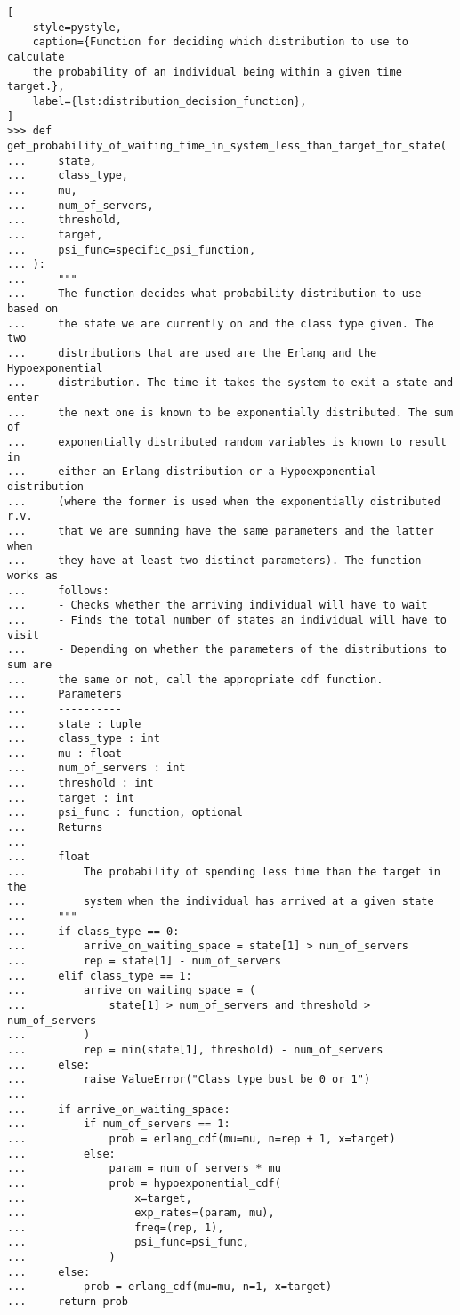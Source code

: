 \begin{lstlisting}[
    style=pystyle,
    caption={Function for deciding which distribution to use to calculate
    the probability of an individual being within a given time target.},
    label={lst:distribution_decision_function},
]
>>> def get_probability_of_waiting_time_in_system_less_than_target_for_state(
...     state,
...     class_type,
...     mu,
...     num_of_servers,
...     threshold,
...     target,
...     psi_func=specific_psi_function,
... ):
...     """
...     The function decides what probability distribution to use based on
...     the state we are currently on and the class type given. The two
...     distributions that are used are the Erlang and the Hypoexponential
...     distribution. The time it takes the system to exit a state and enter
...     the next one is known to be exponentially distributed. The sum of
...     exponentially distributed random variables is known to result in
...     either an Erlang distribution or a Hypoexponential distribution
...     (where the former is used when the exponentially distributed r.v.
...     that we are summing have the same parameters and the latter when
...     they have at least two distinct parameters). The function works as
...     follows:
...     - Checks whether the arriving individual will have to wait
...     - Finds the total number of states an individual will have to visit
...     - Depending on whether the parameters of the distributions to sum are
...     the same or not, call the appropriate cdf function.
...     Parameters
...     ----------
...     state : tuple
...     class_type : int
...     mu : float
...     num_of_servers : int
...     threshold : int
...     target : int
...     psi_func : function, optional
...     Returns
...     -------
...     float
...         The probability of spending less time than the target in the
...         system when the individual has arrived at a given state
...     """
...     if class_type == 0:
...         arrive_on_waiting_space = state[1] > num_of_servers
...         rep = state[1] - num_of_servers
...     elif class_type == 1:
...         arrive_on_waiting_space = (
...             state[1] > num_of_servers and threshold > num_of_servers
...         )
...         rep = min(state[1], threshold) - num_of_servers
...     else:
...         raise ValueError("Class type bust be 0 or 1")
... 
...     if arrive_on_waiting_space:
...         if num_of_servers == 1:
...             prob = erlang_cdf(mu=mu, n=rep + 1, x=target)
...         else:
...             param = num_of_servers * mu
...             prob = hypoexponential_cdf(
...                 x=target,
...                 exp_rates=(param, mu),
...                 freq=(rep, 1),
...                 psi_func=psi_func,
...             )
...     else:
...         prob = erlang_cdf(mu=mu, n=1, x=target)
...     return prob

\end{lstlisting}

